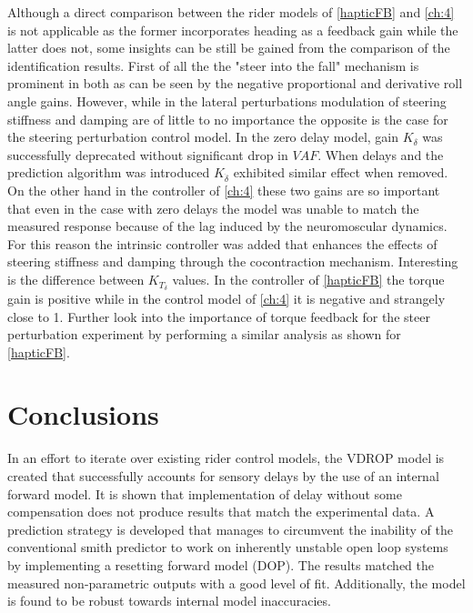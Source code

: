Although a direct comparison between the rider models of \cref{hapticFB} and \cref{ch:4} is not applicable as the former incorporates heading as a feedback gain while the latter does not, some insights can be still be gained from the comparison of the identification results. First of all the the "steer into the fall" mechanism is prominent in both as can be seen by the negative proportional and derivative roll angle gains. However, while in the lateral perturbations modulation of steering stiffness and damping are of little to no importance the opposite is the case for the steering perturbation control model. In the zero delay model, gain \ensuremath{K_\delta} was successfully deprecated without  significant drop in \ensuremath{\mathit{VAF}}. When delays and the prediction algorithm was introduced \ensuremath{K_{\dot{\delta}}} exhibited similar effect when removed. On the other hand in the controller of \cref{ch:4} these two gains are so important that even in the case with zero delays the model was unable to match the measured response because of the lag induced by the neuromoscular dynamics. For this reason the intrinsic controller was added that enhances the effects of steering stiffness and damping through the cocontraction mechanism. Interesting is the difference between \ensuremath{K_{T_\delta}} values. In the controller of \cref{hapticFB} the torque gain is positive while in the control model of \cref{ch:4} it is negative and strangely close to 1. Further look into the importance of torque feedback for the steer perturbation experiment by performing a similar analysis as shown for \cref{hapticFB}. 
\chapter{Conclusions}
 
In an effort to iterate over existing rider control models, the VDROP model is created that successfully accounts for sensory delays by the use of an internal forward model. It is shown that implementation of delay without some compensation does not produce results that match the experimental data.  A prediction strategy is developed that manages to  circumvent the inability of the conventional smith predictor to work on inherently unstable open loop systems by implementing a resetting forward model (DOP). The results matched the  measured non-parametric outputs with a good level of fit. Additionally, the model is found to be robust towards internal model inaccuracies. 
 
